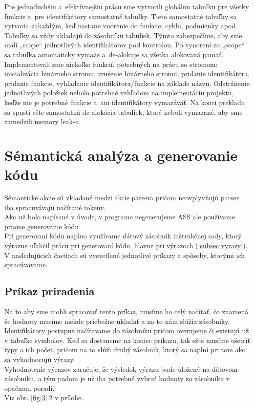 \documentclass[a4paper,11pt]{article}
\begin{document}
		\noindent Pre jednoduchšiu a~efektívnejšiu prácu sme vytvorili globálnu tabuľku pre všetky funkcie a~pre identifikátory samostatné tabuľky. Tieto samostatné tabuľky sa vytvoria zakaždým, keď nastane vnorenie do funkcie, cyklu, podmienky apod. Tabuľky sa vždy ukladajú do zásobníku tabuliek. Týmto zabezpečíme, aby sme mali „scope“ jednotlivých identifikátorov pod kontrolou. Po vynorení zo „scope“ sa tabuľka automaticky vymaže a~de-alokuje sa všetka alokovaná pamäť.\\

		\noindent Implementovali sme niekoľko funkcií, potrebných na prácu so stromom: inicializácia binárneho stromu, zrušenie binárneho stromu, pridanie identifikátora, pridanie funkcie, vyhľadanie identifikátora/funkcie na základe názvu. Odstránenie jednotlivých položiek nebolo potrebné vzhľadom na implementáciu projektu, keďže nie je potrebné funkcie a~ani identifikátory vymazávať. Na konci prekladu sa spustí ešte samostatná de-alokácia tabuliek, ktoré neboli vymazané, aby sme zamedzili memory leak-u.\\

	\section{Sémantická analýza a generovanie kódu}\label{sec:sem} 
		Sémantické akcie sú vkladané medzi akcie parsera pričom neovplyvňujú parser, iba spracuvávaju načítané tokeny.\\
		Ako už bolo napísané v úvode, v programe negenerujeme ASS ale používame priame generovanie kódu.\\
		Pri generovaní kódu naplno využívame dátový zásobník inštrukčnej sady, ktorý výrazne uľahčil prácu pri generovaní kódu, hlavne pri výrazoch (\ref{subsec:vyrazy}).\\
		V nasledujúcich častiach sú vysvetlené jednotlivé príkazy a spôsoby, ktorými ich spracúvavame.\\
	
		\subsection{Príkaz priradenia}\label{subsec:prirad}

		Na to aby sme mohli spracovať tento príkaz, musíme ho celý načítať, čo znamená že hodnoty  musíme niekde priebežne ukladať a na to nám slúžia zásobniky.\\
		Identifikátory postupne načítavame do zásobniku pričom overujeme či existujú už v tabuľke symbolov. Keď sa dostaneme na koniec príkazu, tak ešte musíme ošetriť typy a ich počet, pričom na to slúži druhý zásobnik, ktorý sa naplní pri tom ako sa vyhodnocujú výrazy.\\ Vyhodnotenie výrazov zaručuje, že výsledok výrazu bude uložený na dátovom zásobniku, a tým padom je už iba potrebné vybrať hodnoty zo zásobníku v opačnom poradí.\\
		Viz obr. \ref{fig:3}.2 v prílohe.
	
\end{document}
